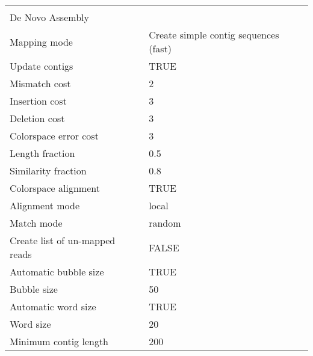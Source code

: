 \begin{longtable}{ll}
                                             &                                                \\
De Novo Assembly                             &                                                \\
Mapping mode                                 & Create simple contig sequences (fast)          \\
Update contigs                               & TRUE                                           \\
Mismatch cost                                & 2                                              \\
Insertion cost                               & 3                                              \\
Deletion cost                                & 3                                              \\
Colorspace error cost                        & 3                                              \\
Length fraction                              & 0.5                                            \\
Similarity fraction                          & 0.8                                            \\
Colorspace alignment                         & TRUE                                           \\
Alignment mode                               & local                                          \\
Match mode                                   & random                                         \\
Create list of un-mapped reads               & FALSE                                          \\
Automatic bubble size                        & TRUE                                           \\
Bubble size                                  & 50                                             \\
Automatic word size                          & TRUE                                           \\
Word size                                    & 20                                             \\
Minimum contig length                        & 200                                            \\

\end{longtable}
